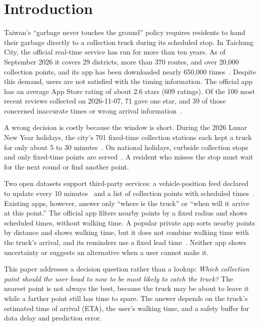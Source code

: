 \section{Introduction}\label{sec:intro}
Taiwan's ``garbage never touches the ground'' policy requires residents
to hand their garbage directly to a collection truck during its scheduled
stop. In Taichung City, the official real-time service has run for more
than ten years. As of September 2026 it covers 29 districts, more than
370 routes, and over 20{,}000 collection points, and its app has been
downloaded nearly 650{,}000 times~\cite{tcepb2026cleaner}. Despite this
demand, users are not satisfied with the timing information. The official
app has an average App Store rating of about 2.6 stars (609 ratings). Of
the 100 most recent reviews collected on 2026-11-07, 71 gave one star,
and 39 of those concerned inaccurate times or wrong arrival
information~\cite{appstore_official}.

A wrong decision is costly because the window is short. During the 2026
Lunar New Year holidays, the city's 701 fixed-time collection stations
each kept a truck for only about 5 to 30 minutes~\cite{tcepb2026spring}.
On national holidays, curbside collection stops and only fixed-time
points are served~\cite{tcepb_holiday}. A resident who misses the stop
must wait for the next round or find another point.

Two open datasets support third-party services: a vehicle-position feed
declared to update every 10 minutes~\cite{dataset83558} and a list of
collection points with scheduled times~\cite{dataset84004}. Existing
apps, however, answer only ``where is the truck'' or ``when will it
arrive at this point.'' The official app filters nearby points by a fixed
radius and shows scheduled times, without walking time. A popular private
app sorts nearby points by distance and shows walking time, but it does
not combine walking time with the truck's arrival, and its reminders use
a fixed lead time~\cite{appstore_private}. Neither app shows uncertainty
or suggests an alternative when a user cannot make it.

This paper addresses a decision question rather than a lookup:
\emph{Which collection point should the user head to now to be most
likely to catch the truck?} The nearest point is not always the best,
because the truck may be about to leave it while a farther point still
has time to spare. The answer depends on the truck's estimated time of
arrival (ETA), the user's walking time, and a safety buffer for data
delay and prediction error.

